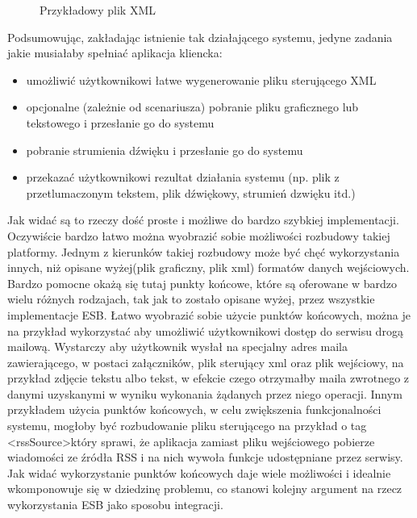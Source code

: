 \setlength\fboxsep{20pt}
\setlength\fboxrule{1pt}
\begin{figure}[!h]
	\centering
	\caption{Przykładowy plik XML}
\end{figure}

Podsumowując, zakładając istnienie tak działającego systemu, jedyne zadania jakie musiałaby spełniać aplikacja kliencka:
\begin{itemize}
	\item umożliwić użytkownikowi łatwe wygenerowanie pliku sterującego XML
	\item opcjonalne (zależnie od scenariusza) pobranie pliku graficznego lub tekstowego i przesłanie go do systemu
	\item pobranie strumienia dźwięku i przesłanie go do systemu
	\item przekazać użytkownikowi rezultat działania systemu (np. plik z przetlumaczonym tekstem, plik dźwiękowy, strumień dzwięku itd.)
\end{itemize}
Jak widać są to rzeczy dość proste i możliwe do bardzo szybkiej implementacji. Oczywiście bardzo łatwo można wyobrazić sobie możliwości rozbudowy takiej platformy. Jednym z kierunków takiej rozbudowy może być chęć wykorzystania innych, niż opisane wyżej(plik graficzny, plik xml) formatów danych wejściowych.  Bardzo pomocne okażą się tutaj punkty końcowe, które są oferowane w bardzo wielu różnych rodzajach, tak jak to zostało opisane wyżej, przez wszystkie implementacje ESB. Łatwo wyobrazić sobie użycie punktów końcowych, można je na przykład wykorzystać aby umożliwić użytkownikowi dostęp do serwisu drogą mailową. Wystarczy aby użytkownik wysłał na specjalny adres maila zawierającego, w postaci załączników, plik sterujący xml oraz plik wejściowy, na przykład zdjęcie tekstu albo tekst, w efekcie czego otrzymałby maila zwrotnego z danymi uzyskanymi w wyniku wykonania żądanych przez niego operacji. Innym przykładem użycia punktów końcowych, w celu zwiększenia funkcjonalności systemu, mogłoby być rozbudowanie pliku sterującego na przykład o tag \textless rssSource\textgreater który sprawi, że aplikacja zamiast pliku wejściowego pobierze wiadomości ze źródła RSS i na nich wywoła funkcje udostępniane przez serwisy. Jak widać wykorzystanie punktów końcowych daje wiele możliwości i idealnie wkomponowuje się w dziedzinę problemu, co stanowi kolejny argument na rzecz wykorzystania ESB jako sposobu integracji.

